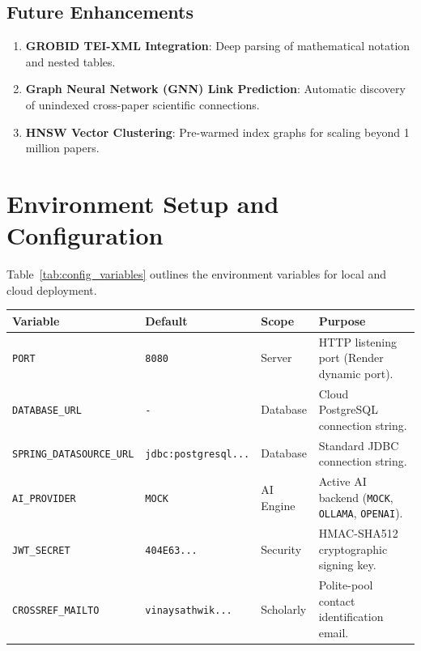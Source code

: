 \documentclass[11pt,a4paper,titlepage]{report}
\begin{document}
\section{Future Enhancements}
\begin{enumerate}[label=\textbf{\arabic*.}]
    \item \textbf{GROBID TEI-XML Integration}: Deep parsing of mathematical notation and nested tables.
    \item \textbf{Graph Neural Network (GNN) Link Prediction}: Automatic discovery of unindexed cross-paper scientific connections.
    \item \textbf{HNSW Vector Clustering}: Pre-warmed index graphs for scaling beyond 1 million papers.
\end{enumerate}

\appendix
\chapter{Environment Setup and Configuration}
Table~\ref{tab:config_variables} outlines the environment variables for local and cloud deployment.

\begin{center}
\label{tab:config_variables}
\vspace{3pt}
\begin{tabularx}{\textwidth}{lllX}
\toprule
\textbf{Variable} & \textbf{Default} & \textbf{Scope} & \textbf{Purpose} \\
\midrule
\texttt{PORT} & \texttt{8080} & Server & HTTP listening port (Render dynamic port). \\
\texttt{DATABASE\_URL} & \texttt{-} & Database & Cloud PostgreSQL connection string. \\
\texttt{SPRING\_DATASOURCE\_URL} & \texttt{jdbc:postgresql...} & Database & Standard JDBC connection string. \\
\texttt{AI\_PROVIDER} & \texttt{MOCK} & AI Engine & Active AI backend (\texttt{MOCK}, \texttt{OLLAMA}, \texttt{OPENAI}). \\
\texttt{JWT\_SECRET} & \texttt{404E63...} & Security & HMAC-SHA512 cryptographic signing key. \\
\texttt{CROSSREF\_MAILTO} & \texttt{vinaysathwik...} & Scholarly & Polite-pool contact identification email. \\
\bottomrule
\end{tabularx}
\end{center}
\end{document}
